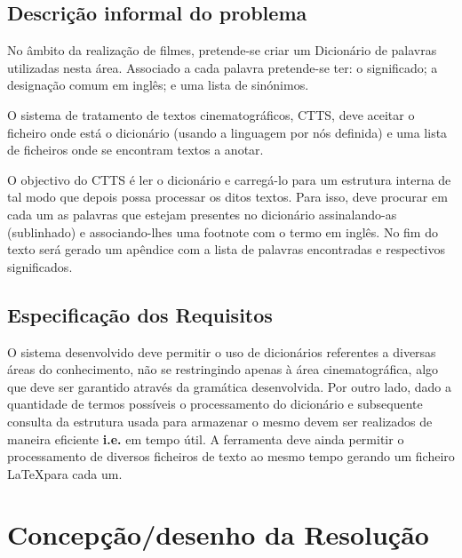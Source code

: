 \documentclass{llncs}
\begin{document}
\subsection{Descrição informal do problema}
No âmbito da realização de filmes, pretende-se criar um Dicionário de palavras utilizadas nesta área. Associado a cada palavra pretende-se ter: o significado; a designação comum em inglês; e uma lista de sinónimos.

O sistema de tratamento de textos cinematográficos, CTTS, deve aceitar o ficheiro onde está o dicionário (usando a linguagem por nós definida) e uma lista de ficheiros onde se encontram textos a anotar.

O objectivo do CTTS é ler o dicionário e carregá-lo para um estrutura interna de tal modo que depois possa processar os ditos textos. Para isso, deve procurar em cada um as palavras que estejam presentes no dicionário assinalando-as (sublinhado) e associando-lhes uma footnote com o termo em inglês. No fim do texto será gerado um apêndice com a lista de palavras encontradas e respectivos significados.

\subsection{Especificação dos Requisitos}
O sistema desenvolvido deve permitir o uso de dicionários referentes a diversas áreas do conhecimento, não se restringindo apenas à área cinematográfica, algo que deve ser garantido através da gramática desenvolvida. Por outro lado, dado a quantidade de termos possíveis o processamento do dicionário e subsequente consulta da estrutura usada para armazenar o mesmo devem ser realizados de maneira eficiente \textbf{i.e.} em tempo útil. A ferramenta deve ainda permitir o processamento de diversos ficheiros de texto ao mesmo tempo gerando um ficheiro \LaTeX para cada um.

\section{Concepção/desenho da Resolução}
\end{document}
